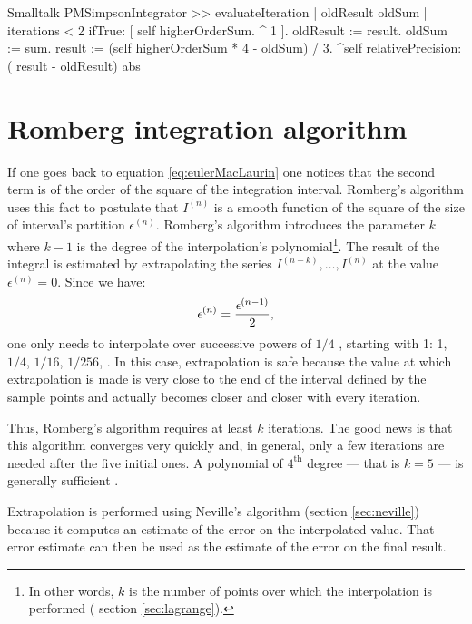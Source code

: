 \begin{displaycode}{Smalltalk}
PMSimpsonIntegrator >> evaluateIteration
| oldResult oldSum |
    iterations < 2
        ifTrue: [ self higherOrderSum.
                  ^ 1 ].
    oldResult := result.
    oldSum := sum.
    result := (self higherOrderSum * 4 - oldSum) / 3.
    ^self relativePrecision: ( result - oldResult) abs
\end{displaycode}

\section{Romberg integration algorithm}
\label{sec:romberg}
If one goes back to equation \ref{eq:eulerMacLaurin} one notices that the second term is of the
order of the square of the integration interval. Romberg's
algorithm uses this fact to postulate that $I^{\left(n\right)}$ is
a smooth function of the square of the size of interval's
partition $\epsilon^{\left(n\right)}$. Romberg's algorithm
introduces the parameter $k$ where $k-1$ is the degree of the
interpolation's polynomial\footnote{In other words, $k$ is the
number of points over which the interpolation is performed (\cf
section \ref{sec:lagrange}).}. The result of the integral is
estimated by extrapolating the series
$I^{\left(n-k\right)},\ldots,I^{\left(n\right)}$ at the value
$\epsilon^{\left(n\right)}=0$. Since we have:
\begin{equation}
\epsilon^{\left(n\right)}={\epsilon^{\left(n-1\right)} \over 2},
\end{equation}
one only needs to interpolate over successive powers of $1/4$ ,
starting with 1: 1, $1/4$, $1/16$, $1/256$, \etc. In this case,
extrapolation is safe because the value at which extrapolation is
made is very close to the end of the interval defined by the
sample points and actually becomes closer and closer with every
iteration.

Thus, Romberg's algorithm requires at least $k$ iterations. The
good news is that this algorithm converges very quickly and, in
general, only a few iterations are needed after the five initial
ones. A polynomial of $4^{\mathop{\textrm{th}}}$ degree --- that is
$k=5$ --- is generally sufficient \cite{Press}.

Extrapolation is performed using Neville's algorithm (\cf section
\ref{sec:neville}) because it computes an estimate of the error on
the interpolated value. That error estimate can then be used as
the estimate of the error on the final result.

